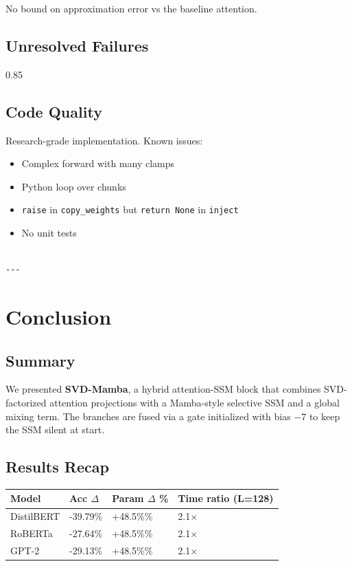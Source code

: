 No bound on approximation error vs the baseline attention.

\subsection{Unresolved Failures}

0.85

\subsection{Code Quality}

Research-grade implementation. Known issues:

\begin{itemize}
\item Complex forward with many clamps
\item Python loop over chunks
\item \texttt{raise} in \texttt{copy\_weights} but \texttt{return None} in \texttt{inject}
\item No unit tests
\end{itemize}
\begin{lstlisting}

---
\end{lstlisting}


\section{Conclusion}

\subsection{Summary}

We presented \textbf{SVD-Mamba}, a hybrid attention-SSM block that combines 
SVD-factorized attention projections with a Mamba-style selective SSM and 
a global mixing term. The branches are fused via a gate initialized with 
bias $-7$ to keep the SSM silent at start.

\subsection{Results Recap}

\begin{table}[H]
\centering
\small
\begin{tabular}{llll}
\toprule
\textbf{Model} & \textbf{Acc $\Delta$} & \textbf{Param $\Delta$ \%} & \textbf{Time ratio (L=128)} \\
\midrule
DistilBERT & -39.79\% & +48.5\%\% & 2.1$\times$ \\
RoBERTa & -27.64\% & +48.5\%\% & 2.1$\times$ \\
GPT-2 & -29.13\% & +48.5\%\% & 2.1$\times$ \\
\bottomrule
\end{tabular}
\end{table}

